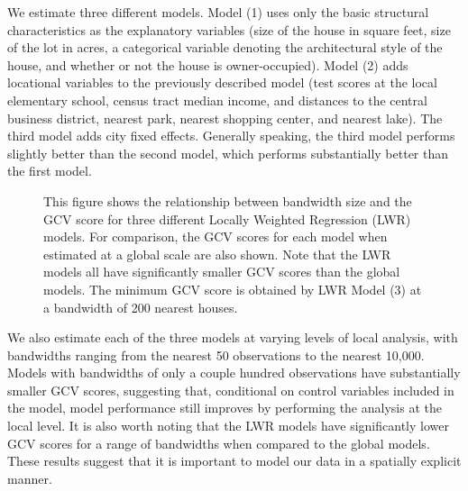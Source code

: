 \documentclass{article}\usepackage{graphicx, color}
\begin{document}
We estimate three different models. Model (1) uses only the basic structural characteristics as the explanatory variables (size of the house in square feet, size of the lot in acres, a categorical variable denoting the architectural style of the house, and whether or not the house is owner-occupied). Model (2) adds locational variables to the previously described model (test scores at the local elementary school, census tract median income, and distances to the central business district, nearest park, nearest shopping center, and nearest lake). The third model adds city fixed effects. Generally speaking, the third model performs slightly better than the second model, which performs substantially better than the first model. 
\begin{figure}
\caption{This figure shows the relationship between bandwidth size and the GCV score for three different Locally Weighted Regression (LWR) models. For comparison, the GCV scores for each model when estimated at a global scale are also shown. Note that the LWR models all have significantly smaller GCV scores than the global models. The minimum GCV score is obtained by LWR Model (3) at a bandwidth of 200 nearest houses.}\label{fig:GCVmodel}
\end{figure}

We also estimate each of the three models at varying levels of local analysis, with bandwidths ranging from the nearest 50 observations to the nearest 10,000. Models with bandwidths of only a couple hundred observations have substantially smaller GCV scores, suggesting that, conditional on control variables included in the model, model performance still improves by performing the analysis at the local level. It is also worth noting that the LWR models have significantly lower GCV scores for a range of bandwidths when compared to the global models. These results suggest that it is important to model our data in a spatially explicit manner. 
\end{document}
